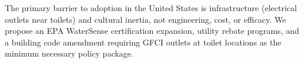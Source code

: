 \documentclass[10pt,letterpaper]{article}
\begin{document}
The primary barrier to adoption in the United States is infrastructure
(electrical outlets near toilets) and cultural inertia, not engineering,
cost, or efficacy. We propose an EPA WaterSense certification expansion,
utility rebate programs, and a building code amendment requiring GFCI outlets
at toilet locations as the minimum necessary policy package.

%
\end{document}
